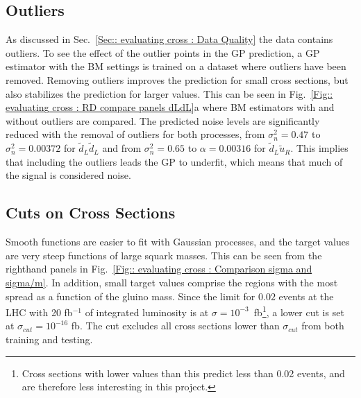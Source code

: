 \documentclass[twoside,english]{uiofysmaster}
\begin{document}
{%

\subsection{Outliers}


As discussed in Sec.~\ref{Sec:: evaluating cross : Data Quality} the data contains outliers. To see the effect of the outlier points in the GP prediction, a GP estimator with the BM settings is trained on a dataset where outliers have been removed. Removing outliers improves the prediction for small cross sections, but also stabilizes the prediction for larger values. This can be seen in Fig.~\ref{Fig:: evaluating cross : RD compare panels dLdL}a where BM estimators with and without outliers are compared. The predicted noise levels are significantly reduced with the removal of outliers for both processes, from $\sigma_n^2 = 0.47$ to $\sigma_n^2 = 0.00372$ for $\widetilde{d}_L \widetilde{d}_L$ and from $\sigma_n^2 = 0.65$ to $\alpha= 0.00316$ for $\widetilde{d}_L \widetilde{u}_R$. This implies that including the outliers leads the GP to underfit, which means that much of the signal is considered noise.   


\subsection{Cuts on Cross Sections}

Smooth functions are easier to fit with Gaussian processes, and the target values are very steep functions of large squark masses. This can be seen from the righthand panels in Fig.~\ref{Fig:: evaluating cross : Comparison sigma and sigma/m}. In addition, small target values comprise the regions with the most spread as a function of the gluino mass. Since the limit for $0.02$ events at the LHC with 20 fb$^{-1}$ of integrated luminosity is at $\sigma = 10^{-3}$~fb\footnote{Cross sections with lower values than this predict less than 0.02 events, and are therefore less interesting in this project.}, a lower cut is set at $\sigma_{cut} = 10^{-16}$ fb. The cut excludes all cross sections lower than $\sigma_{cut}$ from both training and testing. 

}
\end{document}
